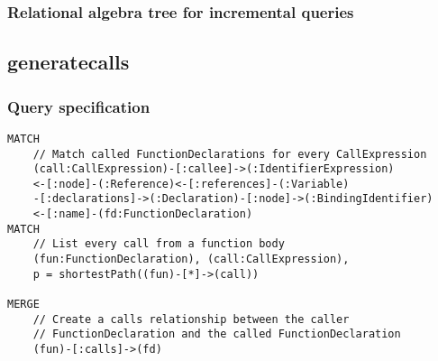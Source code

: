 \subsubsection*{Relational algebra tree for incremental queries}

\subsection{generatecalls}

\subsubsection*{Query specification}

\begin{lstlisting}
MATCH
    // Match called FunctionDeclarations for every CallExpression
    (call:CallExpression)-[:callee]->(:IdentifierExpression)
    <-[:node]-(:Reference)<-[:references]-(:Variable)
    -[:declarations]->(:Declaration)-[:node]->(:BindingIdentifier)
    <-[:name]-(fd:FunctionDeclaration)
MATCH
    // List every call from a function body
    (fun:FunctionDeclaration), (call:CallExpression),
    p = shortestPath((fun)-[*]->(call))

MERGE
    // Create a calls relationship between the caller
    // FunctionDeclaration and the called FunctionDeclaration
    (fun)-[:calls]->(fd)
\end{lstlisting}

